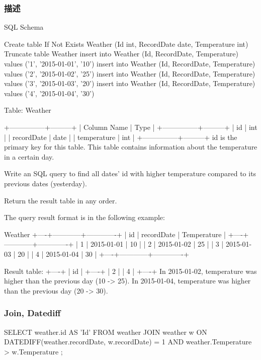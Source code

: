 \subsubsection{描述}
SQL Schema

\begin{Code}
Create table If Not Exists Weather (Id int, RecordDate date, Temperature int)
Truncate table Weather
insert into Weather (Id, RecordDate, Temperature) values ('1', '2015-01-01', '10')
insert into Weather (Id, RecordDate, Temperature) values ('2', '2015-01-02', '25')
insert into Weather (Id, RecordDate, Temperature) values ('3', '2015-01-03', '20')
insert into Weather (Id, RecordDate, Temperature) values ('4', '2015-01-04', '30')
\end{Code}

Table: Weather

\begin{Code}
+---------------+---------+
| Column Name   | Type    |
+---------------+---------+
| id            | int     |
| recordDate    | date    |
| temperature   | int     |
+---------------+---------+
id is the primary key for this table.
This table contains information about the temperature in a certain day.
\end{Code}

Write an SQL query to find all dates' id with higher temperature compared to its previous dates (yesterday).

Return the result table in any order.

The query result format is in the following example:
\begin{Code}
Weather
+----+------------+-------------+
| id | recordDate | Temperature |
+----+------------+-------------+
| 1  | 2015-01-01 | 10          |
| 2  | 2015-01-02 | 25          |
| 3  | 2015-01-03 | 20          |
| 4  | 2015-01-04 | 30          |
+----+------------+-------------+

Result table:
+----+
| id |
+----+
| 2  |
| 4  |
+----+
In 2015-01-02, temperature was higher than the previous day (10 -> 25).
In 2015-01-04, temperature was higher than the previous day (20 -> 30).
\end{Code}


\subsubsection{Join, Datediff}
\begin{Code}
SELECT
    weather.id AS 'Id'
FROM
    weather
        JOIN
    weather w ON DATEDIFF(weather.recordDate, w.recordDate) = 1
        AND weather.Temperature > w.Temperature
;
\end{Code}

